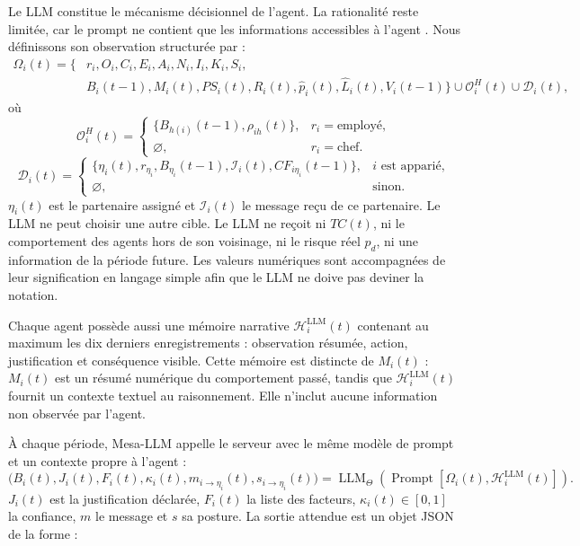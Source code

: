 \documentclass[10pt,a4paper]{article}
\begin{document}
Le LLM constitue le mécanisme décisionnel de l’agent. La rationalité reste
limitée, car le prompt ne contient que les informations accessibles à l’agent
\cite{simon1997}. Nous définissons son observation structurée par :
\[
\begin{aligned}
\Omega_i(t)=\{&
r_i,O_i,C_i,E_i,A_i,N_i,I_i,K_i,S_i,\\
&B_i(t-1),M_i(t),PS_i(t),R_i(t),
\widehat p_i(t),\widehat L_i(t),V_i(t-1)\}
\cup\mathcal O_i^H(t)\cup\mathcal D_i(t),
\end{aligned}
\]
où
\[
\mathcal O_i^H(t)=
\begin{cases}
\{B_{h(i)}(t-1),\rho_{ih}(t)\},&r_i=\text{employé},\\
\varnothing,&r_i=\text{chef}.
\end{cases}
\]
\[
\mathcal D_i(t)=
\begin{cases}
\{\eta_i(t),r_{\eta_i},B_{\eta_i}(t-1),
\mathcal I_i(t),CF_{i\eta_i}(t-1)\},&i\text{ est apparié},\\
\varnothing,&\text{sinon}.
\end{cases}
\]
$\eta_i(t)$ est le partenaire assigné et $\mathcal I_i(t)$ le message reçu de
ce partenaire. Le LLM ne peut choisir une autre cible.
Le LLM ne reçoit ni $TC(t)$, ni le comportement des agents hors de son
voisinage, ni le risque réel $p_d$, ni une information de la période future.
Les valeurs numériques sont accompagnées de leur signification en langage
simple afin que le LLM ne doive pas deviner la notation.

Chaque agent possède aussi une mémoire narrative
$\mathcal H_i^{\mathrm{LLM}}(t)$ contenant au maximum les dix derniers
enregistrements : observation résumée, action, justification et conséquence
visible. Cette mémoire est distincte de $M_i(t)$ : $M_i(t)$ est un résumé
numérique du comportement passé, tandis que
$\mathcal H_i^{\mathrm{LLM}}(t)$ fournit un contexte textuel au raisonnement.
Elle n’inclut aucune information non observée par l’agent.

À chaque période, Mesa-LLM appelle le serveur avec le même modèle de prompt et
un contexte propre à l’agent \cite{mesallm2026} :
\[
\bigl(B_i(t),J_i(t),F_i(t),\kappa_i(t),
m_{i\rightarrow\eta_i}(t),s_{i\rightarrow\eta_i}(t)\bigr)
=
\operatorname{LLM}_{\Theta}
\!\left(\operatorname{Prompt}
[\Omega_i(t),\mathcal H_i^{\mathrm{LLM}}(t)]\right).
\]
$J_i(t)$ est la justification déclarée, $F_i(t)$ la liste des facteurs,
$\kappa_i(t)\in[0,1]$ la confiance, $m$ le message et $s$ sa posture. La sortie
attendue est un objet JSON de la forme :
\end{document}
